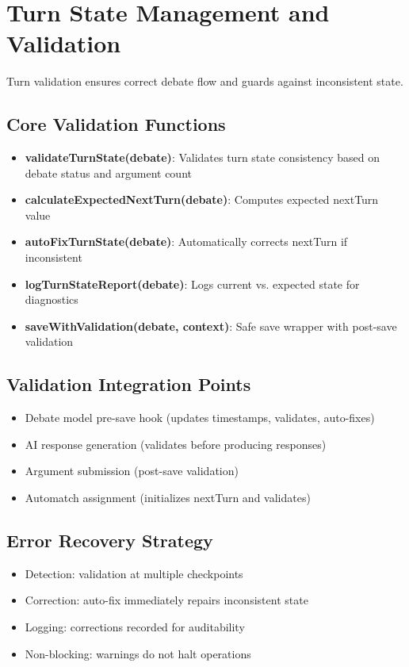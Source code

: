 \section{Turn State Management and Validation}

Turn validation ensures correct debate flow and guards against inconsistent state.

\subsection{Core Validation Functions}
\begin{itemize}
    \item \textbf{validateTurnState(debate)}: Validates turn state consistency based on debate status
    and argument count
    \item \textbf{calculateExpectedNextTurn(debate)}: Computes expected nextTurn value
    \item \textbf{autoFixTurnState(debate)}: Automatically corrects nextTurn if inconsistent
    \item \textbf{logTurnStateReport(debate)}: Logs current vs. expected state for diagnostics
    \item \textbf{saveWithValidation(debate, context)}: Safe save wrapper with post-save validation
\end{itemize}

\subsection{Validation Integration Points}
\begin{itemize}
    \item Debate model pre-save hook (updates timestamps, validates, auto-fixes)
    \item AI response generation (validates before producing responses)
    \item Argument submission (post-save validation)
    \item Automatch assignment (initializes nextTurn and validates)
\end{itemize}

\subsection{Error Recovery Strategy}
\begin{itemize}
    \item Detection: validation at multiple checkpoints
    \item Correction: auto-fix immediately repairs inconsistent state
    \item Logging: corrections recorded for auditability
    \item Non-blocking: warnings do not halt operations
\end{itemize}


